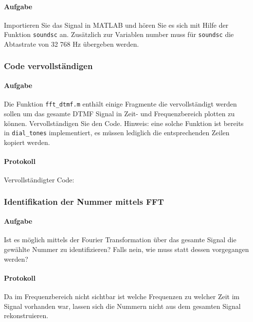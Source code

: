 \documentclass[10pt]{scrreprt}
\begin{document}
        \paragraph{Aufgabe}
        Importieren Sie das Signal in MATLAB und hören Sie es sich mit Hilfe der Funktion
        \texttt{soundsc} an. Zusätzlich zur Variablen \glqq{}number\grqq{} muss für \texttt{soundsc} die Abtastrate
        von 32 768 Hz übergeben werden.

        \subsubsection{Code vervollständigen}
        \paragraph{Aufgabe}
        Die Funktion \texttt{fft\_dtmf.m} enthält einige Fragmente die vervollständigt werden sollen
        um das gesamte DTMF Signal in Zeit- und Frequenzbereich plotten zu können. Vervollständigen Sie den Code. Hinweis: eine solche Funktion ist bereits in
        \texttt{dial\_tones}
        implementiert, es müssen lediglich die entsprechenden Zeilen kopiert werden.
        \paragraph{Protokoll}

        Vervollständigter Code:

        

        \subsubsection{Identifikation der Nummer mittels FFT}
        \paragraph{Aufgabe}
        Ist es möglich mittels der Fourier Transformation über das gesamte Signal die
        gewählte Nummer zu identifizieren? Falls nein, wie muss statt dessen vorgegangen werden?

        \paragraph{Protokoll}
        Da im Frequenzbereich nicht sichtbar ist welche Frequenzen zu welcher Zeit
        im Signal vorhanden war, lassen sich die Nummern nicht aus dem gesamten
        Signal rekonstruieren.
\end{document}
